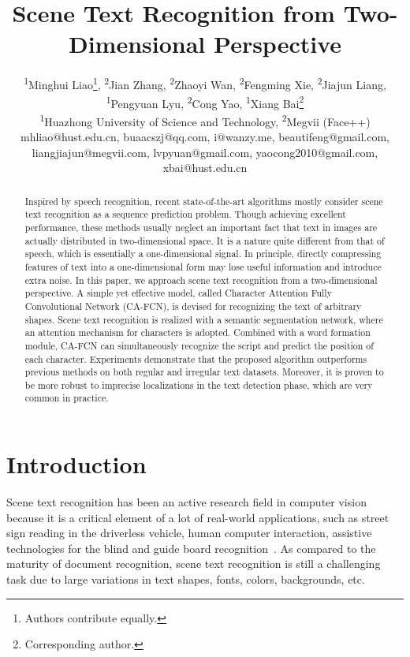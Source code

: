 \documentclass[letterpaper]{article} \usepackage{aaai19}  \usepackage{times}  \usepackage{helvet}  \usepackage{courier}  \usepackage{url}  \usepackage{graphicx}  \frenchspacing  \usepackage{multirow}
\begin{document}
\title{Scene Text Recognition from Two-Dimensional Perspective}
\author{\textsuperscript{1}Minghui Liao\thanks{Authors contribute equally.}, \textsuperscript{2}Jian Zhang\footnotemark[\value{footnote}]
, \textsuperscript{2}Zhaoyi Wan\footnotemark[\value{footnote}], \textsuperscript{2}Fengming Xie, \AND \textsuperscript{2}Jiajun Liang, \textsuperscript{1}Pengyuan Lyu, \textsuperscript{2}Cong Yao, \textsuperscript{1}Xiang Bai\thanks{Corresponding author.}\\
\textsuperscript{1}Huazhong University of Science and Technology,  
\textsuperscript{2}Megvii (Face++)\\ 
mhliao@hust.edu.cn, buaacszj@qq.com, i@wanzy.me, beautifeng@gmail.com,\\ liangjiajun@megvii.com, lvpyuan@gmail.com, yaocong2010@gmail.com, xbai@hust.edu.cn}
\nocopyright
\maketitle
\begin{abstract}
Inspired by speech recognition, recent state-of-the-art algorithms mostly consider scene text recognition as a sequence prediction problem. Though achieving excellent performance, these methods usually neglect an important fact that text in images are actually distributed in two-dimensional space. It is a nature quite different from that of speech, which is essentially a one-dimensional signal. In principle, directly compressing features of text into a one-dimensional form may lose useful information and introduce extra noise. In this paper, we approach scene text recognition from a two-dimensional perspective. A simple yet effective model, called Character Attention Fully Convolutional Network (CA-FCN), is devised for recognizing the text of arbitrary shapes. Scene text recognition is realized with a semantic segmentation network, where an attention mechanism for characters is adopted. Combined with a word formation module, CA-FCN can simultaneously recognize the script and predict the position of each character. Experiments demonstrate that the proposed algorithm outperforms previous methods on both regular and irregular text datasets. Moreover, it is proven to be more robust to imprecise localizations in the text detection phase, which are very common in practice.
\end{abstract}

\section{Introduction}
Scene text recognition has been an active research field in computer vision because it is a critical element of a lot of real-world applications, such as street sign
reading in the driverless vehicle, human computer interaction, assistive technologies for the blind and guide board recognition~\cite{DBLP:conf/eccv/RongYT16,ZhuLYL18}. As compared to the maturity of document recognition, scene text recognition is still a challenging task due to large variations in text shapes, fonts, colors, backgrounds, etc.
\end{document}
